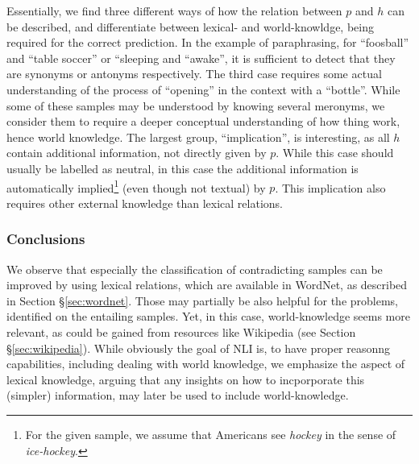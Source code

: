 Essentially, we find three different ways of how the relation between $p$ and $h$ can be described, and differentiate between lexical- and world-knowldge, being required for the correct prediction. In the example of paraphrasing, for ``foosball'' and ``table soccer'' or ``sleeping and ``awake'', it is sufficient to detect that they are synonyms or antonyms respectively. The third case requires some actual understanding of the process of ``opening'' in the context with a ``bottle''. While some of these samples may be understood by knowing several meronyms, we consider them to require a deeper conceptual understanding of how thing work, hence world knowledge. The largest group, ``implication'',   is interesting, as all $h$ contain additional information, not directly given by $p$. While this case should usually be labelled as neutral, in this case the additional information is automatically implied\footnote{For the given sample, we assume that Americans see \textit{hockey} in the sense of \textit{ice-hockey}.} (even though not textual) by $p$. This implication also requires other external knowledge than lexical relations.

\subsubsection{Conclusions}
We observe that especially the classification of contradicting samples can be improved by using lexical relations, which are available in WordNet, as described in Section §\ref{sec:wordnet}. Those may partially be also helpful for the problems, identified on the entailing samples. Yet, in this case, world-knowledge seems more relevant, as could be gained from resources like Wikipedia (see Section §\ref{sec:wikipedia}). While obviously the goal of \ac{NLI} is, to have proper reasonng capabilities, including dealing with world knowledge, we emphasize the aspect of lexical knowledge, arguing that any insights on how to incporporate this (simpler) information, may later be used to include world-knowledge.
\newline

